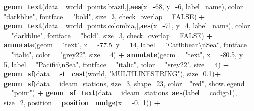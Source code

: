 \documentclass[12pt,twoside]{reedthesis}
\newenvironment{Shaded}{\begin{snugshade}}{\end{snugshade}}
\newcommand{\CharTok}[1]{\textcolor[rgb]{0.31,0.60,0.02}{#1}}
\newcommand{\DataTypeTok}[1]{\textcolor[rgb]{0.13,0.29,0.53}{#1}}
\newcommand{\DecValTok}[1]{\textcolor[rgb]{0.00,0.00,0.81}{#1}}
\newcommand{\FloatTok}[1]{\textcolor[rgb]{0.00,0.00,0.81}{#1}}
\newcommand{\KeywordTok}[1]{\textcolor[rgb]{0.13,0.29,0.53}{\textbf{#1}}}
\newcommand{\NormalTok}[1]{#1}
\newcommand{\OperatorTok}[1]{\textcolor[rgb]{0.81,0.36,0.00}{\textbf{#1}}}
\newcommand{\OtherTok}[1]{\textcolor[rgb]{0.56,0.35,0.01}{#1}}
\newcommand{\StringTok}[1]{\textcolor[rgb]{0.31,0.60,0.02}{#1}}
\begin{document}
\begin{Shaded}
\begin{Highlighting}[]
{{{{\StringTok{  }\KeywordTok{geom_text}\NormalTok{(}\DataTypeTok{data=}\NormalTok{ world_points[brazil,],}\KeywordTok{aes}\NormalTok{(}\DataTypeTok{x=}\OperatorTok{-}\DecValTok{68}\NormalTok{, }\DataTypeTok{y=}\OperatorTok{-}\DecValTok{6}\NormalTok{, }\DataTypeTok{label=}\NormalTok{name), }\DataTypeTok{color =} \StringTok{"darkblue"}\NormalTok{, }\DataTypeTok{fontface =} \StringTok{"bold"}\NormalTok{, }\DataTypeTok{size=}\DecValTok{3}\NormalTok{, }\DataTypeTok{check_overlap =} \OtherTok{FALSE}\NormalTok{) }\OperatorTok{+}
\StringTok{  }\KeywordTok{geom_text}\NormalTok{(}\DataTypeTok{data=}\NormalTok{ world_points[colombia,],}\KeywordTok{aes}\NormalTok{(}\DataTypeTok{x=}\OperatorTok{-}\DecValTok{71}\NormalTok{, }\DataTypeTok{y=}\DecValTok{4}\NormalTok{, }\DataTypeTok{label=}\NormalTok{name), }\DataTypeTok{color =} \StringTok{"darkblue"}\NormalTok{, }\DataTypeTok{fontface =} \StringTok{"bold"}\NormalTok{, }\DataTypeTok{size=}\DecValTok{3}\NormalTok{, }\DataTypeTok{check_overlap =} \OtherTok{FALSE}\NormalTok{) }\OperatorTok{+}
\StringTok{  }\KeywordTok{annotate}\NormalTok{(}\DataTypeTok{geom =} \StringTok{"text"}\NormalTok{, }\DataTypeTok{x =} \FloatTok{-77.5}\NormalTok{, }\DataTypeTok{y =} \DecValTok{14}\NormalTok{, }\DataTypeTok{label =} \StringTok{"Caribbean}\CharTok{\textbackslash{}n}\StringTok{Sea"}\NormalTok{, }\DataTypeTok{fontface =} \StringTok{"italic"}\NormalTok{, }\DataTypeTok{color =} \StringTok{"grey22"}\NormalTok{, }\DataTypeTok{size =} \DecValTok{4}\NormalTok{) }\OperatorTok{+}\StringTok{ }
\StringTok{  }\KeywordTok{annotate}\NormalTok{(}\DataTypeTok{geom =} \StringTok{"text"}\NormalTok{, }\DataTypeTok{x =} \FloatTok{-80.5}\NormalTok{, }\DataTypeTok{y =} \DecValTok{5}\NormalTok{, }\DataTypeTok{label =} \StringTok{"Pacific}\CharTok{\textbackslash{}n}\StringTok{Sea"}\NormalTok{, }\DataTypeTok{fontface =} \StringTok{"italic"}\NormalTok{, }\DataTypeTok{color =} \StringTok{"grey22"}\NormalTok{, }\DataTypeTok{size =} \DecValTok{4}\NormalTok{) }\OperatorTok{+}
\StringTok{  }\KeywordTok{geom_sf}\NormalTok{(}\DataTypeTok{data =} \KeywordTok{st_cast}\NormalTok{(world, }\StringTok{"MULTILINESTRING"}\NormalTok{),  }\DataTypeTok{size=}\FloatTok{0.1}\NormalTok{)}\OperatorTok{+}
\StringTok{  }\KeywordTok{geom_sf}\NormalTok{(}\DataTypeTok{data =}\NormalTok{ ideam_stations, }\DataTypeTok{size=}\DecValTok{3}\NormalTok{, }\DataTypeTok{shape=}\DecValTok{23}\NormalTok{, }\DataTypeTok{color=} \StringTok{"red"}\NormalTok{, }\DataTypeTok{show.legend =} \StringTok{"point"}\NormalTok{) }\OperatorTok{+}\StringTok{ }
\StringTok{  }\KeywordTok{geom_sf_text}\NormalTok{(}\DataTypeTok{data =}\NormalTok{ ideam_stations, }\KeywordTok{aes}\NormalTok{(}\DataTypeTok{label =}\NormalTok{ codigo1), }\DataTypeTok{size=}\DecValTok{2}\NormalTok{, }\DataTypeTok{position =} \KeywordTok{position_nudge}\NormalTok{(}\DataTypeTok{x =} \FloatTok{-0.11}\NormalTok{)) }\OperatorTok{+}
}}}}
\end{Highlighting}
\end{Shaded}
\end{document}

